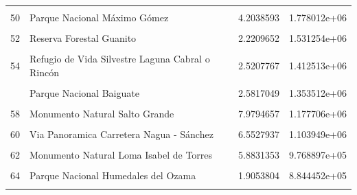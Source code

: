 \documentclass[10pt,landscape,a3paper]{article}
\begin{document}
\begin{longtable}[t]{llrr}
\cellcolor{lightgray}{49} & \cellcolor{lightgray}{Reserva Cientifica Las Neblinas} & \cellcolor{lightgray}{4.7686062} & \cellcolor{lightgray}{1.944454e+06}\\
50 & Parque Nacional Máximo Gómez & 4.2038593 & 1.778012e+06\\
\addlinespace
\cellcolor{lightgray}{51} & \cellcolor{lightgray}{Area Nacional De Recreo Guagui} & \cellcolor{lightgray}{4.2107689} & \cellcolor{lightgray}{1.746368e+06}\\
52 & Reserva Forestal Guanito & 2.2209652 & 1.531254e+06\\
\cellcolor{lightgray}{53} & \cellcolor{lightgray}{Monumento Natural La Tinaja} & \cellcolor{lightgray}{4.9885378} & \cellcolor{lightgray}{1.472586e+06}\\
54 & Refugio de Vida Silvestre Laguna Cabral o Rincón & 2.5207767 & 1.412513e+06\\
\cellcolor{lightgray}{55} & \cellcolor{lightgray}{Monumento Natural Salto El Limón} & \cellcolor{lightgray}{8.3638311} & \cellcolor{lightgray}{1.377940e+06}\\
\addlinespace
56 & Parque Nacional Baiguate & 2.5817049 & 1.353512e+06\\
\cellcolor{lightgray}{57} & \cellcolor{lightgray}{Via Panoramica Mirador del Paraíso} & \cellcolor{lightgray}{6.4120055} & \cellcolor{lightgray}{1.347963e+06}\\
58 & Monumento Natural Salto Grande & 7.9794657 & 1.177706e+06\\
\cellcolor{lightgray}{59} & \cellcolor{lightgray}{Via Panoramica Carretera Santiago - La Cumbre - Puerto Plata} & \cellcolor{lightgray}{5.5960474} & \cellcolor{lightgray}{1.174054e+06}\\
60 & Via Panoramica Carretera Nagua - Sánchez & 6.5527937 & 1.103949e+06\\
\addlinespace
\cellcolor{lightgray}{61} & \cellcolor{lightgray}{Reserva Forestal Loma Novillero} & \cellcolor{lightgray}{7.7993952} & \cellcolor{lightgray}{1.005301e+06}\\
62 & Monumento Natural Loma Isabel de Torres & 5.8831353 & 9.768897e+05\\
\cellcolor{lightgray}{63} & \cellcolor{lightgray}{Refugio de Vida Silvestre Laguna Saladilla} & \cellcolor{lightgray}{3.0472813} & \cellcolor{lightgray}{9.481367e+05}\\
64 & Parque Nacional Humedales del Ozama & 1.9053804 & 8.844452e+05\\
\cellcolor{lightgray}{65} & \cellcolor{lightgray}{Via Panoramica Vía Panorámica Costa Azul} & \cellcolor{lightgray}{4.3664582} & \cellcolor{lightgray}{8.322460e+05}\\

\end{longtable}
\end{document}
